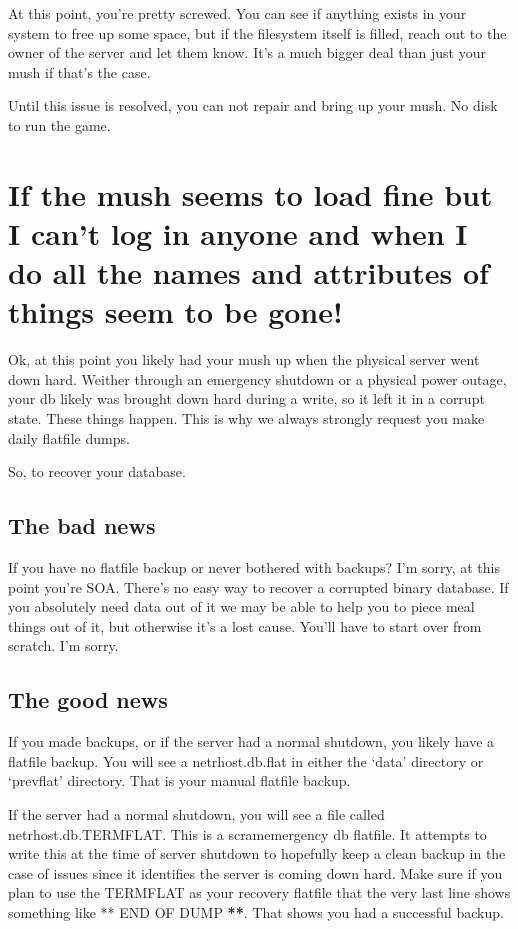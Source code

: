 \documentclass[letterpaper,10pt,english]{sphinxmanual}
\begin{document}
\sphinxAtStartPar
At this point, you’re pretty screwed.  You can see if anything exists
in your system to free up some space, but if the filesystem itself
is filled, reach out to the owner of the server and let them know.
It’s a much bigger deal than just your mush if that’s the case.

\sphinxAtStartPar
Until this issue is resolved, you can not repair and bring up your mush.
No disk to run the game.


\section{If the mush seems to load fine but I can’t log in anyone and when I do all the names and attributes of things seem to be gone!}
\label{\detokenize{27-dbcorrupt:if-the-mush-seems-to-load-fine-but-i-can-t-log-in-anyone-and-when-i-do-all-the-names-and-attributes-of-things-seem-to-be-gone}}
\sphinxAtStartPar
Ok, at this point you likely had your mush up when the physical server
went down hard.  Weither through an emergency shutdown or a physical
power outage, your db likely was brought down hard during a write,
so it left it in a corrupt state.  These things happen.  This is
why we always strongly request you make daily flatfile dumps.

\sphinxAtStartPar
So, to recover your database.


\subsection{The bad news}
\label{\detokenize{27-dbcorrupt:the-bad-news}}
\sphinxAtStartPar
If you have no flatfile backup or never bothered with backups?
I’m sorry, at this point you’re SOA.  There’s no easy way to
recover a corrupted binary database.  If you absolutely need
data out of it we may be able to help you to piece meal things
out of it, but otherwise it’s a lost cause.  You’ll have to start
over from scratch.  I’m sorry.


\subsection{The good news}
\label{\detokenize{27-dbcorrupt:the-good-news}}
\sphinxAtStartPar
If you made backups, or if the server had a normal shutdown, you
likely have a flatfile backup.  You will see a netrhost.db.flat
in either the ‘data’ directory or ‘prevflat’ directory.  That
is your manual flatfile backup.

\sphinxAtStartPar
If the server had a normal shutdown, you will see a file called
netrhost.db.TERMFLAT.  This is a scram\sphinxhyphen{}emergency db flatfile.
It attempts to write this at the time of server shutdown to
hopefully keep a clean backup in the case of issues since
it identifies the server is coming down hard.  Make sure
if you plan to use the TERMFLAT as your recovery flatfile
that the very last line shows something like ** END OF DUMP {\color{red}\bfseries{}**}.
That shows you had a successful backup.
\end{document}

